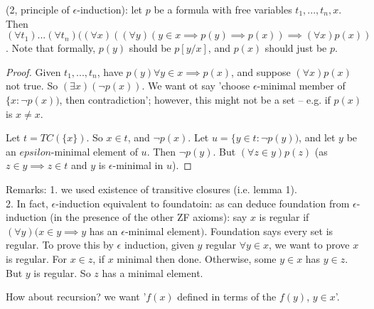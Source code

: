 \documentclass[a4paper]{article}
\begin{document}
\begin{thm} (2, principle of $\epsilon$-induction): let $p$ be a formula with free variables $t_1,...,t_n,x$. Then $(\forall t_1)...(\forall t_n) ((\forall x) ((\forall y)(y \in x \implies p(y) \implies p(x)) \implies (\forall x) p(x))$. Note that formally, $p(y)$ should be $p[y/x]$, and $p(x)$ should just be $p$.
\begin{proof}
Given $t_1,...,t_n$, have $p(y) \forall y \in x \implies p(x)$, and suppose $(\forall x) p(x)$ not true. So $(\exists x) (\neg p(x))$. We want ot say 'choose $\epsilon$-minimal member of $\{x: \neg p(x))$, then contradiction'; however, this might not be a set -- e.g. if $p(x)$ is $x \neq x$.

Let $t = TC(\{x\})$. So $x \in t$, and $\neg p(x)$. Let $u =\{y \in t: \neg p(y))$, and let $y$ be an $epsilon$-minimal element of $u$. Then $\neg p(y)$. But $(\forall z \in y) p(z)$ (as $z \in y \implies z \in t$ and $y$ is $\epsilon$-minimal in $u$).
\end{proof}
\end{thm}

Remarks: 1. we used existence of transitive closures (i.e. lemma 1).\\
2. In fact, $\epsilon$-induction equivalent to foundatoin: as can deduce foundation from $\epsilon$-induction (in the presence of the other ZF axioms): say $x$ is regular if $(\forall y) (x \in y \implies y$ has an $\epsilon$-minimal element$)$. Foundation says every set is regular. To prove this by $\epsilon$ induction, given $y$ regular $\forall y \in x$, we want to prove $x$ is regular. For $x \in z$, if $x$ minimal then done. Otherwise, some $y \in x$ has $y \in z$. But $y$ is regular. So $z$ has a minimal element.

How about recursion? we want '$f(x)$ defined in terms of the $f(y)$, $y \in x$'.
\end{document}
